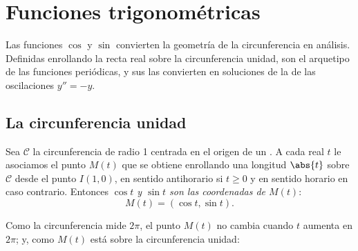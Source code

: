 \chapter{Funciones trigonométricas}\label{ch:g12:trigo}

Las funciones $\cos$ y $\sin$ convierten la geometría de la circunferencia
en análisis. Definidas enrollando la recta real sobre la circunferencia
unidad, son el arquetipo de las funciones periódicas, y sus  las
convierten en soluciones de la  de las oscilaciones $y'' = -y$.

\section{La circunferencia unidad}

\begin{definition}\label{def:g12:trigo:cossin}
Sea $\mathcal{C}$ la circunferencia de radio 1 centrada en el origen de un
 . A cada real $t$ le asociamos el punto
$M(t)$ que se obtiene enrollando una longitud $\abs{t}$ sobre
$\mathcal{C}$ desde el punto $I(1,0)$, en sentido antihorario si
$t \geq 0$ y en sentido horario en caso contrario. Entonces
\emph{$\cos t$ y $\sin t$ son las coordenadas de
$M(t)$}:
\[
M(t) = (\cos t, \sin t).
\]
\end{definition}

\begin{omfigure}
\end{omfigure}

Como la circunferencia mide $2\pi$, el punto $M(t)$ no cambia cuando $t$
aumenta en $2\pi$; y, como $M(t)$ está sobre la circunferencia unidad:

